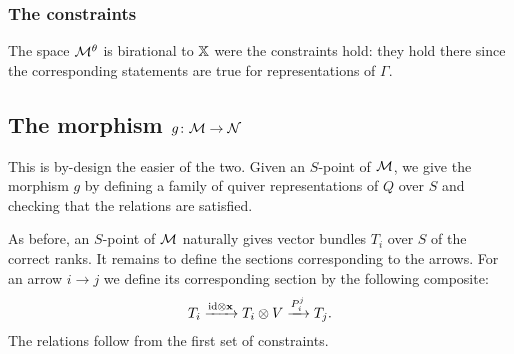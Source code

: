 \documentclass{amsart}
\theoremstyle{definition}
\begin{document}
\subsubsection{The constraints}

The space $\mathcal{M}^\theta$ is birational to $\mathbb{X}$ were the constraints hold: they hold there since the corresponding statements are true for representations of $\Gamma$.

\subsection{The morphism $g \colon \mathcal{M} \rightarrow \mathcal{N}$}

This is by-design the easier of the two.
Given an $S$-point of $\mathcal{M}$, we give the morphism $g$ by defining a family of quiver representations of $Q$ over $S$ and checking that the relations are satisfied.

As before, an $S$-point of $\mathcal{M}$ naturally gives vector bundles $T_i$ over $S$ of the correct ranks.
It remains to define the sections corresponding to the arrows.
For an arrow $i \rightarrow j$ we define its corresponding section by the following composite:
$$T_i \xrightarrow{\text{id} \otimes \mathbf{x}} T_i \otimes V \xrightarrow{P_i^j} T_j.$$
The relations follow from the first set of constraints.
\end{document}
